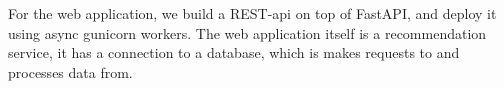 For the web application, we build a REST-api on top of FastAPI, and deploy it
using async gunicorn workers. The web application itself is a recommendation
service, it has a connection to a database, which is makes requests to and
processes data from.






